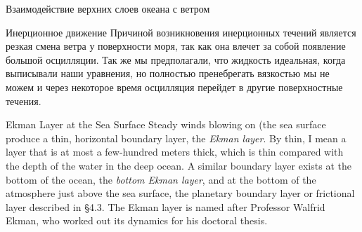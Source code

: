 \begin{chapter}{Взаимодействие верхних слоев океана с ветром}
\begin{section}{Инерционное движение}
Причиной возникновения инерционных течений является резкая смена ветра
у поверхности моря, так как она влечет за собой появление большой
осцилляции. Так же мы предполагали, что жидкость идеальная, когда
выписывали наши уравнения, но полностью пренебрегать вязкостью мы не
можем и через некоторое время осцилляция перейдет в другие
поверхностные течения.
%
\end{section}

\begin{section}{Ekman Layer at the Sea Surface}
Steady winds blowing on (the sea surface produce a thin, horizontal boundary layer,
the \textit{Ekman layer}.  By thin,
I mean a layer that is at most a few-hundred meters thick, which is
thin compared with the depth of the water in the deep ocean. A similar
boundary layer exists at the bottom of the ocean, the \textit{bottom
Ekman layer}, and at the bottom of
the atmosphere just above the sea surface, the planetary boundary
layer or frictional layer described in \S 4.3. The Ekman layer is
named after Professor Walfrid Ekman, who worked out its dynamics for
his doctoral thesis.
%


\end{section}
\end{chapter}
